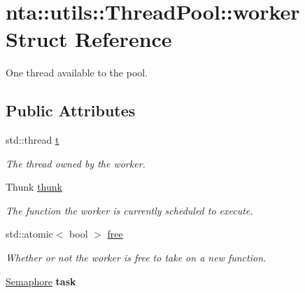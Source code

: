 \hypertarget{structnta_1_1utils_1_1ThreadPool_1_1worker}{}\section{nta\+:\+:utils\+:\+:Thread\+Pool\+:\+:worker Struct Reference}
\label{structnta_1_1utils_1_1ThreadPool_1_1worker}


One thread available to the pool.  


\subsection*{Public Attributes}
\begin{DoxyCompactItemize}
\item 
\mbox{\label{structnta_1_1utils_1_1ThreadPool_1_1worker_a73546e576652ef9cded578d20e1de393}} 
std\+::thread \hyperlink{structnta_1_1utils_1_1ThreadPool_1_1worker_a73546e576652ef9cded578d20e1de393}{t}
\begin{DoxyCompactList}\small\item\em The thread owned by the worker. \end{DoxyCompactList}\item 
\mbox{\label{structnta_1_1utils_1_1ThreadPool_1_1worker_af4dfab6b1c3168a40b90f518991d7efe}} 
Thunk \hyperlink{structnta_1_1utils_1_1ThreadPool_1_1worker_af4dfab6b1c3168a40b90f518991d7efe}{thunk}
\begin{DoxyCompactList}\small\item\em The function the worker is currently scheduled to execute. \end{DoxyCompactList}\item 
\mbox{\label{structnta_1_1utils_1_1ThreadPool_1_1worker_ac891290ce8ae269990cbbd7243cd1817}} 
std\+::atomic$<$ bool $>$ \hyperlink{structnta_1_1utils_1_1ThreadPool_1_1worker_ac891290ce8ae269990cbbd7243cd1817}{free}
\begin{DoxyCompactList}\small\item\em Whether or not the worker is free to take on a new function. \end{DoxyCompactList}\item 
\mbox{\label{structnta_1_1utils_1_1ThreadPool_1_1worker_a7b1599c310dcbf3ed04639aff66fe06f}} 
\hyperlink{classnta_1_1utils_1_1Semaphore}{Semaphore} {\bfseries task}
\end{DoxyCompactItemize}


